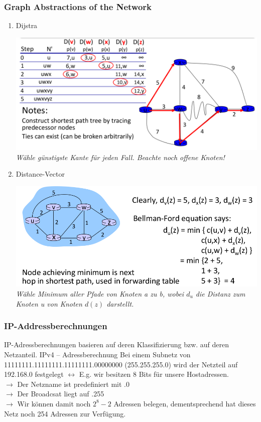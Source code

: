 \documentclass{article}
\begin{document}
    \subsubsection{Graph Abstractions of the Network}
    \begin{enumerate}
        \item Dijstra
        \begin{center}
            \includegraphics[width=\textwidth]{Dijkstra.png}\\
            \textit{Wähle günstigste Kante für jeden Fall. Beachte noch offene Knoten!}
        \end{center}
        \item Distance-Vector
        \begin{center}
            \includegraphics[width=\textwidth]{DistanceVector.png}\\
        \textit{Wähle Minimum aller Pfade von Knoten a zu b, wobei $d_u$ die Distanz zum Knoten u von Knoten $d(z)$ darstellt.}
        \end{center}
        
    \end{enumerate}
    \subsubsection{ IP-Addressberechnungen}
    IP-Adressberechnungen basieren auf deren Klassifizierung bzw. auf deren Netzanteil.
        IPv4 -- Adressberechnung
        Bei einem Subnetz von 11111111.11111111.11111111.00000000 (255.255.255.0) wird der Netzteil auf 192.168.0 festgelegt $\leftrightarrow$ E.g. wir besitzen 8 Bits für unsere Hostadressen.\\
        $\rightarrow$ Der Netzname ist predefiniert mit .0\\
        $\rightarrow$ Der Broadcsat liegt auf .255\\
        $\rightarrow$ Wir können damit noch $2^8 - 2$ Adressen belegen, dementsprechend hat dieses Netz noch 254 Adressen zur Verfügung.\\
        
\end{document}
